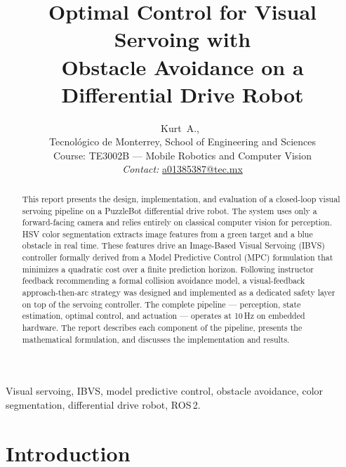 \documentclass[journal, 10pt]{IEEEtran}
\begin{document}
\title{Optimal Control for Visual Servoing with\\
       Obstacle Avoidance on a Differential Drive Robot}

\author{Kurt~A.,~\\
  \small Tecnológico de Monterrey, School of Engineering and Sciences\\
  \small Course: TE3002B — Mobile Robotics and Computer Vision\\
  \small \textit{Contact:} \href{mailto:a01385387@tec.mx}{a01385387@tec.mx}
}


\maketitle

\begin{abstract}
This report presents the design, implementation, and evaluation of a
closed-loop visual servoing pipeline on a PuzzleBot differential drive
robot. The system uses only a forward-facing camera and relies entirely on
classical computer vision for perception. HSV color segmentation extracts
image features from a green target and a blue obstacle in real time. These
features drive an Image-Based Visual Servoing (IBVS) controller formally
derived from a Model Predictive Control (MPC) formulation that minimizes a
quadratic cost over a finite prediction horizon. Following instructor
feedback recommending a formal collision avoidance model, a visual-feedback
approach-then-arc strategy was designed and implemented as a dedicated
safety layer on top of the servoing controller. The complete pipeline ---
perception, state estimation, optimal control, and actuation --- operates
at 10\,Hz on embedded hardware. The report describes each component of the
pipeline, presents the mathematical formulation, and discusses the
implementation and results.
\end{abstract}

\begin{IEEEkeywords}
Visual servoing, IBVS, model predictive control, obstacle avoidance,
color segmentation, differential drive robot, ROS\,2.
\end{IEEEkeywords}

\section{Introduction}
\label{sec:intro}
\end{document}
